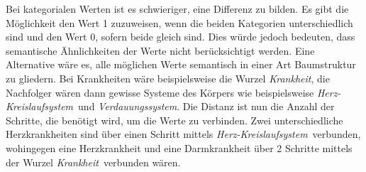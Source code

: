 Bei kategorialen Werten ist es schwieriger, eine Differenz zu bilden.
Es gibt die Möglichkeit den Wert 1 zuzuweisen, wenn die beiden Kategorien unterschiedlich sind und den Wert 0, sofern beide gleich sind. 
Dies würde jedoch bedeuten, dass semantische Ähnlichkeiten der Werte nicht berücksichtigt werden.
Eine Alternative wäre es, alle möglichen Werte semantisch in einer Art Baumstruktur zu gliedern. 
Bei Krankheiten wäre beispielsweise die Wurzel \dq\textit{Krankheit}\dq, die Nachfolger wären dann gewisse Systeme des Körpers wie beispielsweise \dq\textit{Herz-Kreislaufsystem}\dq\ und \dq\textit{Verdauungssystem}\dq.
Die Distanz ist nun die Anzahl der Schritte, die benötigt wird, um die Werte zu verbinden. 
Zwei unterschiedliche Herzkrankheiten sind über einen Schritt mittels \dq\textit{Herz-Kreislaufsystem}\dq\ verbunden, wohingegen eine Herzkrankheit und eine Darmkrankheit über 2 Schritte mittels der Wurzel \dq\textit{Krankheit}\dq\ verbunden wären.